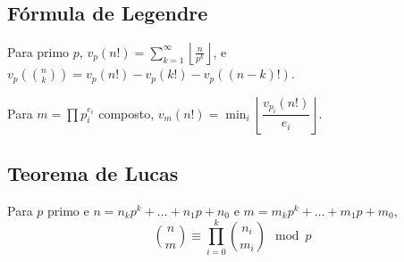 \subsection{Fórmula de Legendre}

Para primo $p$, $v_p(n!) = \sum_{k=1}^{\infty} \left\lfloor \frac{n}{p^k} \right\rfloor$, e
$v_p\left(\binom{n}{k}\right) = v_p(n!) - v_p(k!) - v_p((n-k)!)$.

Para $m = \prod p_i^{e_i}$ composto, $v_m(n!) = \min_i \left\lfloor \dfrac{v_{p_i}(n!)}{e_i} \right\rfloor$.

\subsection{Teorema de Lucas}

Para $p$ primo e $n = n_k p^k + \dotsc + n_1 p + n_0$ e $m = m_k p^k + \dotsc + m_1 p + m_0$,
\[\binom{n}{m} \equiv \prod_{i=0}^{k}\binom{n_i}{m_i} \mod p\]